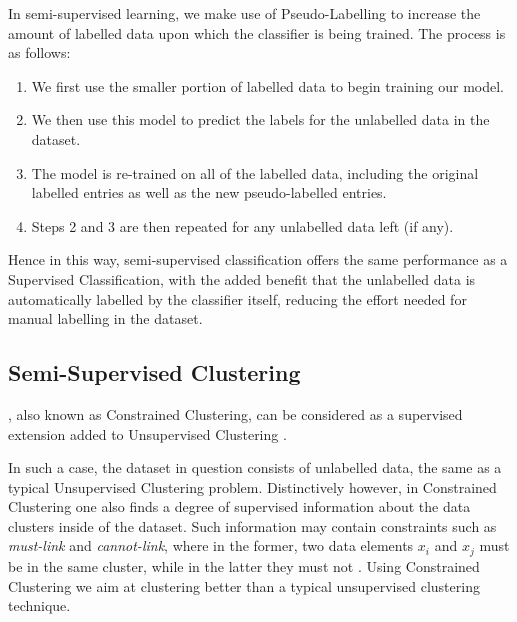 In semi-supervised learning, we make use of Pseudo-Labelling \citep{lee2013pseudo} to increase the amount of labelled data upon which the classifier is being trained. The process is as follows:

\begin{enumerate}
\item We first use the smaller portion of labelled data to begin training our model.
\item We then use this model to predict the labels for the unlabelled data in the dataset.
\item The model is re-trained on all of the labelled data, including the original labelled entries as well as the new pseudo-labelled entries.
\item Steps 2 and 3 are then repeated for any unlabelled data left (if any).
\end{enumerate}

Hence in this way, semi-supervised classification offers the same performance as a Supervised Classification, with the added benefit that the unlabelled data is automatically labelled by the classifier itself, reducing the effort needed for manual labelling in the dataset. 

\subsection{Semi-Supervised Clustering}\label{sec:clust}

, also known as Constrained Clustering, can be considered as a supervised extension added to Unsupervised Clustering \citep{zhu2009introduction, bradley2000constrained}. 

In such a case, the dataset in question consists of unlabelled data, the same as a typical Unsupervised Clustering problem. Distinctively however, in Constrained Clustering one also finds a degree of supervised information about the data clusters inside of the dataset. Such information may contain constraints such as \textit{must-link} and \textit{cannot-link}, where in the former, two data elements $x_i$ and $x_j$ must be in the same cluster, while in the latter they must not \citep{zhu2009introduction}. Using Constrained Clustering we aim at clustering better than a typical unsupervised clustering technique.

